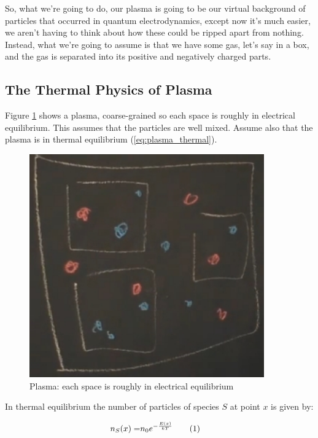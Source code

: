 \documentclass[]{article}
\newcommand\numberthis{\addtocounter{equation}{1}\tag{\theequation}}
\begin{document}
So, what we're going to do, our plasma is going to be our virtual background of particles
that occurred in quantum electrodynamics, except now it's much easier, we aren't having to think about how these could be ripped apart from nothing.
Instead, what we're going to assume is that we have some gas, let's say in a box, and the gas is separated into its positive and negatively charged parts.

\subsection{The Thermal Physics of Plasma}

Figure \ref{fig:plasma} shows a plasma, coarse-grained so each space is roughly in electrical equilibrium. This assumes that the particles are well mixed. Assume also that the plasma is in thermal equilibrium (\ref{eq:plasma_thermal}).
\begin{figure}[H]
	\caption{Plasma: each space is roughly in electrical equilibrium}\label{fig:plasma}
	\includegraphics[width=0.9\textwidth]{plasma}
\end{figure}

In thermal equilibrium the number of particles of species $S$ at point $x$ is given by:

\begin{align*}
	n_S(x)=&n_0 e^{- \frac{E(x)}{kT}}  \numberthis \label{eq:plasma_thermal}
\end{align*}
\end{document}
